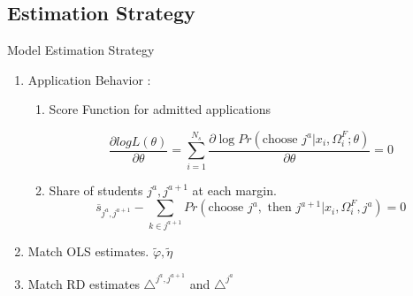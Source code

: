 \documentclass[table,10pt]{beamer}
\begin{document}
\subsection{Estimation Strategy}
\begin{frame}{Model Estimation Strategy}




\begin{enumerate}
\item<2> \alert{ Application Behavior} :

\begin{enumerate}

   \item Score Function for admitted applications

   \begin{equation}\label{equ:momentScore}
   \frac{\partial log L(\theta)}{\partial \theta} = \sum_{i=1}^{N_s}\frac{\partial \log Pr\left(\text{choose } j^a|x_{i},\Omega_{i}^F;\theta \right) }{\partial \theta}=0
   \end{equation}
   \medskip

   \item Share of students $j^a,j^{a+1}$ at each margin.
   \begin{equation}\label{equ:momentShareNextArea}
    \overline{s}_{j^a,j^{a+1}} -  \sum_{k \in j^{a+1}} Pr(\text{choose }j^a,\text{ then }j^{a+1} \big|x_i,\Omega_i^F, j^a)  = 0
   \end{equation}
   \medskip

\end{enumerate}

   \item<3> \alert{Match OLS estimates}. $\tilde{\varphi}, \tilde{\eta}$
   \medskip

   \item<4> \alert{Match RD estimates} $\triangle^{j^{a},j^{a+1}}$ and $\triangle^{j^{a}}$

  \end{enumerate}


\end{frame}
\end{document}
